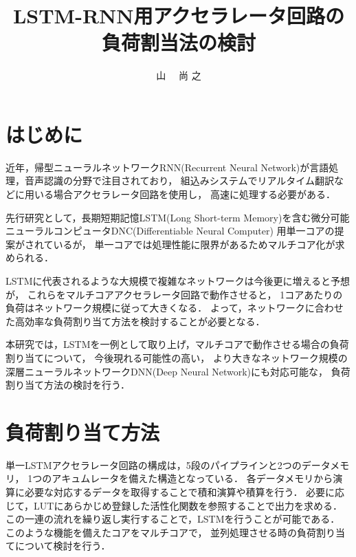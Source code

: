 \documentclass[a4j]{jarticle}
\title{LSTM-RNN用アクセラレータ回路の負荷割当法の検討}
\author{山 \UTF{FA11} ~~尚 之}
\begin{document}
\begin{Abstract}

 \section{はじめに}

近年，帰型ニューラルネットワークRNN(Recurrent Neural Network)が言語処理，音声認識の分野で注目されており，
組込みシステムでリアルタイム翻訳などに用いる場合アクセラレータ回路を使用し，
高速に処理する必要がある．

先行研究として，長期短期記憶LSTM(Long Short-term Memory)を含む微分可能ニューラルコンピュータDNC(Differentiable Neural Computer)
用単一コアの提案\cite{bib:pre-method}がされているが，
単一コアでは処理性能に限界があるためマルチコア化が求められる．

LSTMに代表されるような大規模で複雑なネットワークは今後更に増えると予想が，
これらをマルチコアアクセラレータ回路で動作させると，
1コアあたりの負荷はネットワーク規模に従って大きくなる．
よって，ネットワークに合わせた高効率な負荷割り当て方法を検討することが必要となる．

本研究では，LSTMを一例として取り上げ，マルチコアで動作させる場合の負荷割り当てについて，
今後現れる可能性の高い，
より大きなネットワーク規模の深層ニューラルネットワークDNN(Deep Neural Network)にも対応可能な，
負荷割り当て方法の検討を行う．


 \section{負荷割り当て方法}
単一LSTMアクセラレータ回路の構成は，5段のパイプラインと2つのデータメモリ，
1つのアキュムレータを備えた構造となっている．
各データメモリから演算に必要な対応するデータを取得することで積和演算や積算を行う．
必要に応じて，LUTにあらかじめ登録した活性化関数を参照することで出力を求める．
この一連の流れを繰り返し実行することで，LSTMを行うことが可能である．
このような機能を備えたコアをマルチコアで，
並列処理させる時の負荷割り当てについて検討を行う．


\end{Abstract}
\end{document}
